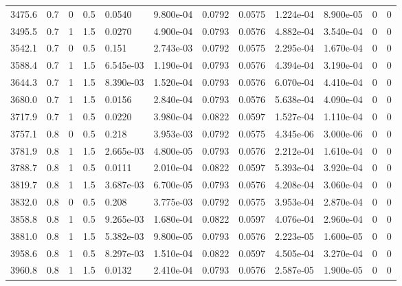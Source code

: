 \documentclass[preview]{standalone}
\begin{document}
{{{\begin{tabular}{L{1.2cm}C{1.2cm} C{0.3cm}C{0.5cm} C{1.4cm}C{1.4cm} C{1.4cm}C{1.4cm} C{1.6cm}C{1.6cm} C{1.6cm}C{1.6cm}}
  3475.6  &   0.7  & 0     & 0.5 &  0.0540  & 9.800e-04  &  0.0792&   0.0575& 1.224e-04 & 8.900e-05   &  0 & 0  \\ 
  3495.5  &   0.7  & 1     & 1.5 &  0.0270  & 4.900e-04  &  0.0793&   0.0576& 4.882e-04 & 3.540e-04   &  0 & 0  \\ 
  3542.1  &   0.7  & 0     & 0.5 &  0.151  & 2.743e-03  &  0.0792&   0.0575& 2.295e-04 & 1.670e-04   &  0 & 0  \\ 
  3588.4  &   0.7  & 1     & 1.5 &  6.545e-03  & 1.190e-04  &  0.0793&   0.0576& 4.394e-04 & 3.190e-04   &  0 & 0  \\ 
  3644.3  &   0.7  & 1     & 1.5 &  8.390e-03  & 1.520e-04  &  0.0793&   0.0576& 6.070e-04 & 4.410e-04   &  0 & 0  \\ 
  3680.0  &   0.7  & 1     & 1.5 &  0.0156  & 2.840e-04  &  0.0793&   0.0576& 5.638e-04 & 4.090e-04   &  0 & 0  \\ 
  3717.9  &   0.7  & 1     & 0.5 &  0.0220  & 3.980e-04  &  0.0822&   0.0597& 1.527e-04 & 1.110e-04   &  0 & 0  \\ 
  3757.1  &   0.8  & 0     & 0.5 &  0.218  & 3.953e-03  &  0.0792&   0.0575& 4.345e-06 & 3.000e-06   &  0 & 0  \\ 
  3781.9  &   0.8  & 1     & 1.5 &  2.665e-03  & 4.800e-05  &  0.0793&   0.0576& 2.212e-04 & 1.610e-04   &  0 & 0  \\ 
  3788.7  &   0.8  & 1     & 0.5 &  0.0111  & 2.010e-04  &  0.0822&   0.0597& 5.393e-04 & 3.920e-04   &  0 & 0  \\ 
  3819.7  &   0.8  & 1     & 1.5 &  3.687e-03  & 6.700e-05  &  0.0793&   0.0576& 4.208e-04 & 3.060e-04   &  0 & 0  \\ 
  3832.0  &   0.8  & 0     & 0.5 &  0.208  & 3.775e-03  &  0.0792&   0.0575& 3.953e-04 & 2.870e-04   &  0 & 0  \\ 
  3858.8  &   0.8  & 1     & 0.5 &  9.265e-03  & 1.680e-04  &  0.0822&   0.0597& 4.076e-04 & 2.960e-04   &  0 & 0  \\ 
  3881.0  &   0.8  & 1     & 1.5 &  5.382e-03  & 9.800e-05  &  0.0793&   0.0576& 2.223e-05 & 1.600e-05   &  0 & 0  \\ 
  3958.6  &   0.8  & 1     & 0.5 &  8.297e-03  & 1.510e-04  &  0.0822&   0.0597& 4.505e-04 & 3.270e-04   &  0 & 0  \\ 
  3960.8  &   0.8  & 1     & 1.5 &  0.0132  & 2.410e-04  &  0.0793&   0.0576& 2.587e-05 & 1.900e-05   &  0 & 0  \\ 
\hline 
\end{tabular} 

}}}
\end{document}
